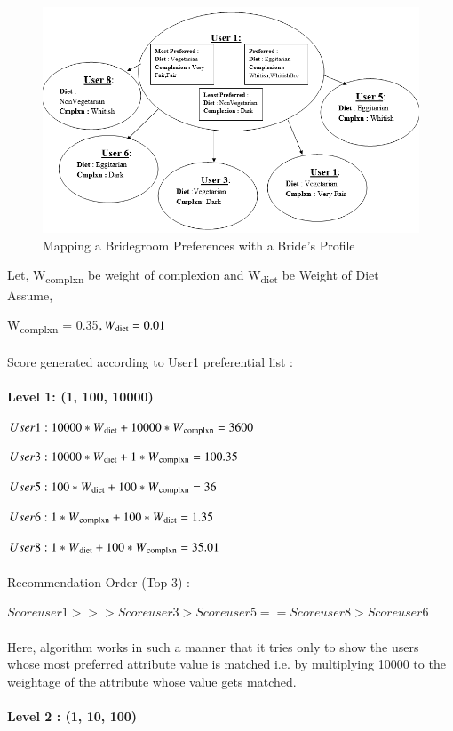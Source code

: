 \documentclass[12pt,oneside]{book}
\begin{document}
\begin{figure}[h]
    \centering
    \includegraphics[width=1.05\textwidth]{upon}
    \caption{Mapping a Bridegroom Preferences with a Bride's Profile}
    \label{fig:upon}
\end{figure}
Let, W\textsubscript{complxn} be weight of complexion and  W\textsubscript{diet} be Weight of Diet\\
Assume,

W\textsubscript{complxn} = 0.35$, W\textsubscript{diet} = 0.01$\\\\
Score generated according to User1 preferential list :\\\\
\textbf{Level 1: (1, 100, 10000)}

$User 1 : 10000 * W\textsubscript{diet} + 10000 * W\textsubscript{complxn} = 3600$

$User 3 : 10000 * W\textsubscript{diet} +  1 * W\textsubscript{complxn} = 100.35$

$User 5 : 100 * W\textsubscript{diet}  + 100 * W\textsubscript{complxn} = 36$

$User 6 : 1* W\textsubscript{complxn} + 100 * W\textsubscript{diet} = 1.35$

$User 8 : 1* W\textsubscript{diet} + 100 * W\textsubscript{complxn} = 35.01$\\\\
Recommendation Order (Top 3) :

$Scoreuser1 > > > Scoreuser3 > Scoreuser5 == Scoreuser8 > Scoreuser6$\\\\
Here, algorithm works in such a manner that it tries only to show the users whose most preferred attribute value is matched i.e. by multiplying 10000 to the weightage of the attribute whose value gets matched.\\\\ 
\textbf{Level 2 : (1, 10, 100)}
\end{document}
